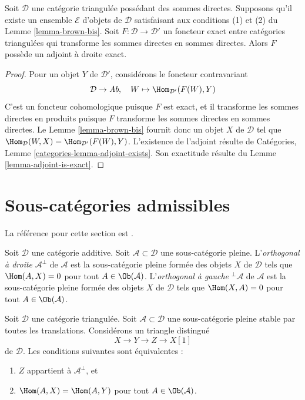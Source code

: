 \begin{proposition}
\label{proposition-brown-bis}
Soit $\mathcal{D}$ une catégorie triangulée possédant des sommes directes.
Supposons qu'il existe un ensemble $\mathcal{E}$ d'objets de $\mathcal{D}$
satisfaisant aux conditions (1) et (2) du Lemme \ref{lemma-brown-bis}.
Soit $F : \mathcal{D} \to \mathcal{D}'$ un foncteur exact entre catégories
triangulées qui transforme les sommes directes en sommes directes.
Alors $F$ possède un adjoint à droite exact.
\end{proposition}

\begin{proof}
Pour un objet $Y$ de $\mathcal{D}'$, considérons le foncteur contravariant
$$
\mathcal{D} \to \textit{Ab},\quad W \mapsto \Hom_{\mathcal{D}'}(F(W), Y)
$$
C'est un foncteur cohomologique puisque $F$ est exact, et il transforme les
sommes directes en produits puisque $F$ transforme les sommes directes en
sommes directes. Le Lemme \ref{lemma-brown-bis} fournit donc un objet $X$ de
$\mathcal{D}$ tel que
$\Hom_\mathcal{D}(W, X) = \Hom_{\mathcal{D}'}(F(W), Y)$.
L'existence de l'adjoint résulte de
Catégories, Lemme \ref{categories-lemma-adjoint-exists}.
Son exactitude résulte du Lemme \ref{lemma-adjoint-is-exact}.
\end{proof}

\section{Sous-catégories admissibles}
\label{section-admissible}

\noindent
La référence pour cette section est \cite[Section 1]{Bondal-Kapranov}.

\begin{definition}
\label{definition-orthogonal}
Soit $\mathcal{D}$ une catégorie additive. Soit
$\mathcal{A} \subset \mathcal{D}$ une sous-catégorie pleine.
L'{\it orthogonal à droite} $\mathcal{A}^\perp$ de $\mathcal{A}$ est la
sous-catégorie pleine formée des objets $X$ de $\mathcal{D}$ tels que
$\Hom(A, X) = 0$ pour tout $A \in \Ob(\mathcal{A})$.
L'{\it orthogonal à gauche} ${}^\perp\mathcal{A}$ de $\mathcal{A}$ est la
sous-catégorie pleine formée des objets $X$ de $\mathcal{D}$ tels que
$\Hom(X, A) = 0$ pour tout $A \in \Ob(\mathcal{A})$.
\end{definition}

\begin{lemma}
\label{lemma-pre-prepare-adjoint}
Soit $\mathcal{D}$ une catégorie triangulée.
Soit $\mathcal{A} \subset \mathcal{D}$ une sous-catégorie pleine stable par
toutes les translations. Considérons un triangle distingué
$$
X \to Y \to Z \to X[1]
$$
de $\mathcal{D}$. Les conditions suivantes sont équivalentes :
\begin{enumerate}
\item $Z$ appartient à $\mathcal{A}^\perp$, et
\item $\Hom(A, X) = \Hom(A, Y)$ pour tout $A \in \Ob(\mathcal{A})$.
\end{enumerate}
\end{lemma}

